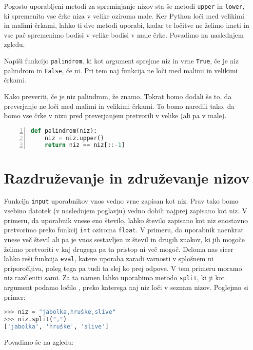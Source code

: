 Pogosto uporabljeni metodi za spreminjanje nizov sta še metodi \texttt{upper} in \texttt{lower}, ki spremenita vse črke niza v velike oziroma male. Ker Python loči med velikimi in malimi črkami, lahko ti dve metodi uporabi, kadar te ločitve ne želimo imeti in vse pač spremenimo bodisi v velike bodisi v male črke. Povadimo na naslednjem zgledu.

\begin{zgled}
Napiši funkcijo \texttt{palindrom}, ki kot argument sprejme niz in vrne \texttt{True}, če je niz palindrom in \texttt{False}, če ni. Pri tem naj funkcija ne loči med malimi in velikimi črkami.
\end{zgled}

\begin{resitev}
Kako preveriti, če je niz palindrom, že znamo. Tokrat bomo dodali še to, da preverjanje ne loči med malimi in velikimi črkami. To bomo naredili tako, da bomo vse črke v nizu pred preverjanjem pretvorili v velike (ali pa v male).
\begin{lstlisting}[language=Python,numbers=left]
def palindrom(niz):
    niz = niz.upper()
    return niz == niz[::-1]
\end{lstlisting}
\end{resitev}

\section{Razdruževanje in združevanje nizov}
Funkcija \texttt{input} uporabnikov vnos vedno vrne zapisan kot niz. Prav tako bomo vsebino datotek (v naslednjem poglavju) vedno dobili najprej zapisano kot niz. V primeru, da uporabnik vnese eno število, lahko število zapisano kot niz enostavno pretvorimo preko funkcij \texttt{int} oziroma \texttt{float}. V primeru, da uporabnik naenkrat vnese več števil ali pa je vnos sestavljen iz števil in drugih znakov, ki jih mogoče želimo pretvoriti v kaj drugega pa ta pristop ni več mogoč. Deloma nas sicer lahko reši funkcija \texttt{eval}, katere uporaba zaradi varnosti v splošnem ni priporočljiva, poleg tega pa tudi ta slej ko prej odpove. V tem primeru moramo niz razčleniti  sami. Za ta namen lahko uporabimo metodo \texttt{split}, ki ji kot argument podamo ločilo , preko katerega naj niz loči v seznam nizov. Poglejmo si primer:
\begin{lstlisting}[language=Python]
>>> niz = "jabolka,hruške,slive"
>>> niz.split(",")
['jabolka', 'hruške', 'slive']
\end{lstlisting}
Povadimo še na zgledu:

